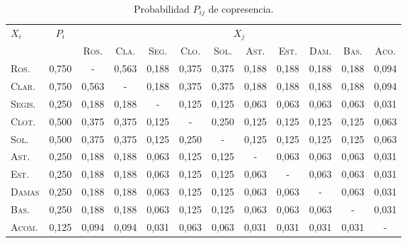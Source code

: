 \begin{table}[!ht]
	\centering\footnotesize
	\begin{tabular}{lccccccccccc}
		\toprule
		$X_i$&$P_i$&\multicolumn{10}{c}{$X_j$}\\
		 \cline{3-12}
		&&\textsc{Ros.} & \textsc{Cla.}& \textsc{Seg.}& \textsc{Clo.}& \textsc{Sol.}& \textsc{Ast.}& \textsc{Est.}& \textsc{Dam.}& \textsc{Bas.}&  \textsc{Aco.} \\
		\midrule
		\textsc{Ros.}  &0{,}750& -     &0{,}563&0{,}188&0{,}375&0{,}375&0{,}188&0{,}188&0{,}188&0{,}188&0{,}094   \\
		\textsc{Clar.} &0{,}750&0{,}563& -     &0{,}188&0{,}375&0{,}375&0{,}188&0{,}188&0{,}188&0{,}188&0{,}094   \\
		\textsc{Segis.}&0{,}250&0{,}188&0{,}188& -     &0{,}125&0{,}125&0{,}063&0{,}063&0{,}063&0{,}063&0{,}031   \\
		\textsc{Clot.} &0{,}500&0{,}375&0{,}375&0{,}125& -     &0{,}250&0{,}125&0{,}125&0{,}125&0{,}125&0{,}063   \\
		\textsc{Sol.}  &0{,}500&0{,}375&0{,}375&0{,}125&0{,}250& -     &0{,}125&0{,}125&0{,}125&0{,}125&0{,}063   \\
		\textsc{Ast.}  &0{,}250&0{,}188&0{,}188&0{,}063&0{,}125&0{,}125& -     &0{,}063&0{,}063&0{,}063&0{,}031   \\
		\textsc{Est.}  &0{,}250&0{,}188&0{,}188&0{,}063&0{,}125&0{,}125&0{,}063& -     &0{,}063&0{,}063&0{,}031   \\
		\textsc{Damas} &0{,}250&0{,}188&0{,}188&0{,}063&0{,}125&0{,}125&0{,}063&0{,}063& -     &0{,}063&0{,}031   \\
		\textsc{Bas.}  &0{,}250&0{,}188&0{,}188&0{,}063&0{,}125&0{,}125&0{,}063&0{,}063&0{,}063& -     &0{,}031   \\	
		\textsc{Acom.} &0{,}125&0{,}094&0{,}094&0{,}031&0{,}063&0{,}063&0{,}031&0{,}031&0{,}031&0{,}031& -   \\
		\bottomrule
	\end{tabular}
	\caption{Probabilidad $P_{ij}$ de copresencia.}
	\label{tab:probabilidad}
\end{table}




